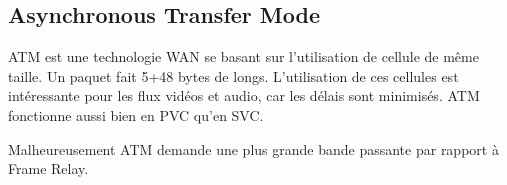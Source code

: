 \subsection{Asynchronous Transfer Mode}
ATM est une technologie WAN se basant sur l'utilisation de cellule de même taille.
Un paquet fait 5+48 bytes de longs.
L'utilisation de ces cellules est intéressante pour les flux vidéos et audio, car les délais sont minimisés.
ATM fonctionne aussi bien en PVC qu'en SVC.

Malheureusement ATM demande une plus grande bande passante par rapport à Frame Relay. 